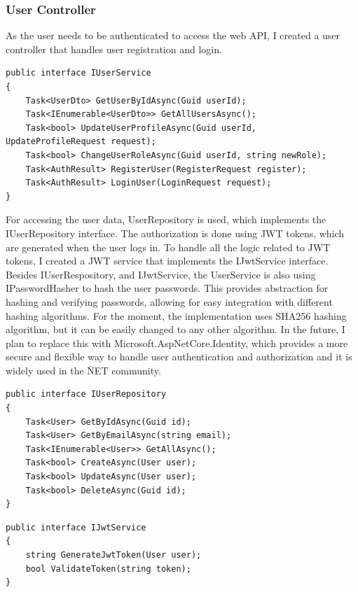 \subsubsection{User Controller}
As the user needs to be authenticated to access the web API,
I created a user controller that handles user registration and login.

\begin{lstlisting}[caption={User Service interface}]
public interface IUserService
{
    Task<UserDto> GetUserByIdAsync(Guid userId);
    Task<IEnumerable<UserDto>> GetAllUsersAsync();
    Task<bool> UpdateUserProfileAsync(Guid userId, UpdateProfileRequest request);
    Task<bool> ChangeUserRoleAsync(Guid userId, string newRole);
    Task<AuthResult> RegisterUser(RegisterRequest register);
    Task<AuthResult> LoginUser(LoginRequest request);
}
\end{lstlisting}

For accessing the user data, UserRepository is used, which implements the IUserRepository interface.
The authorization is done using JWT tokens, 
which are generated when the user logs in. To handle all the logic related to 
JWT tokens, I created a JWT service that implements the IJwtService interface.
Besides IUserRespository, and IJwtService, the UserService is also using
IPasswordHasher to hash the user passwords. This provides abstraction
for hashing and verifying passwords, 
allowing for easy integration with different hashing algorithms. For the moment,
the implementation uses SHA256 hashing algorithm, 
but it can be easily changed to any other algorithm. In the future, I plan to replace
this with Microsoft.AspNetCore.Identity, 
which provides a more secure and flexible way to handle user 
authentication and authorization and it is widely used in the \.NET community.

\begin{lstlisting}[caption={User Repository interface}]
public interface IUserRepository
{
    Task<User> GetByIdAsync(Guid id);
    Task<User> GetByEmailAsync(string email);
    Task<IEnumerable<User>> GetAllAsync();
    Task<bool> CreateAsync(User user);
    Task<bool> UpdateAsync(User user);
    Task<bool> DeleteAsync(Guid id);
}
\end{lstlisting}

\begin{lstlisting}[caption={JWT Service interface}]
public interface IJwtService
{
    string GenerateJwtToken(User user);
    bool ValidateToken(string token);
}
\end{lstlisting}

